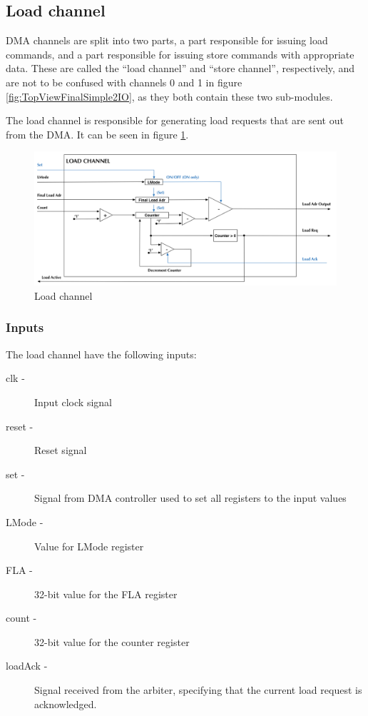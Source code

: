 \begin{appendix}
\subsection{Load channel}
DMA channels are split into two parts,
a part responsible for issuing load commands, and a part responsible for issuing store commands with appropriate data.
These are called the ``load channel'' and ``store channel'', respectively, and are not to be confused with channels 0 and 1 in figure \ref{fig:TopViewFinalSimple2IO}, as they both contain these two sub-modules.
  
The load channel is responsible for generating load requests that are sent out from the DMA.
It can be seen in figure \ref{fig:loadChannel}.

\begin{figure}[h!]
    \centering
    \includegraphics[width=1.0\textwidth]{Figures/DMA/LoadChannel}
    \caption{Load channel}
    \label{fig:loadChannel}
\end{figure}

\subsubsection{Inputs}
The load channel have the following inputs:

\begin{description}
    \item[clk -]
    Input clock signal
    \item[reset -]
    Reset signal
    \item[set - ]
    Signal from DMA controller used to set all registers to the input values
    \item[LMode -]
    Value for LMode register
    \item[FLA -]
    32-bit value for the FLA register
    \item[count -]
    32-bit value for the counter register
    \item[loadAck -]
    Signal received from the arbiter, specifying that the current load request is acknowledged.
\end{description}


\end{appendix}
